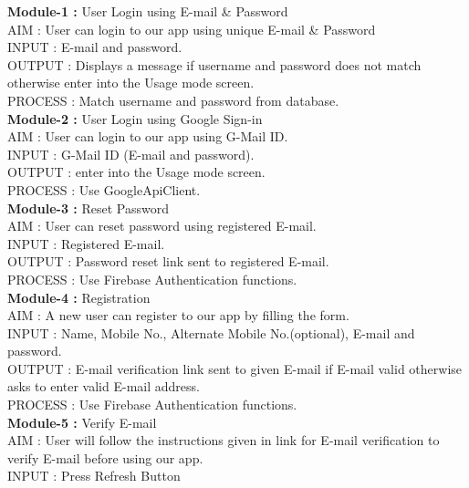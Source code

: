 \documentclass{report}
\begin{document}
\textbf{Module-1 :} User Login using E-mail \& Password \\
AIM : User can login to our app using unique E-mail \& Password\\
                    INPUT : E-mail and password.\\    
                    OUTPUT :  Displays a message if username and password does not match otherwise enter into the Usage mode screen.\\
                    PROCESS : Match username and password from database.\\
\newline
\textbf{Module-2 :} User Login using Google Sign-in\\
                    AIM : User can login to our app using G-Mail ID.\\
                    INPUT : G-Mail ID (E-mail and password).\\
                    OUTPUT : enter into the Usage mode screen.\\
                    PROCESS : Use GoogleApiClient.\\
\newline
\textbf{Module-3 :} Reset Password\\
                    AIM : User can reset password using registered E-mail.\\					INPUT : Registered E-mail.\\
                    OUTPUT : Password reset link sent to registered E-mail.\\
                    PROCESS : Use Firebase Authentication functions.\\
\newline
\textbf{Module-4 :} Registration\\
					AIM : A new user can register to our app by filling the form.\\				INPUT : Name, Mobile No., Alternate Mobile No.(optional), E-mail and password.\\
					OUTPUT : E-mail verification link sent to given E-mail if E-mail valid otherwise asks to enter valid E-mail address.\\
					PROCESS : Use Firebase Authentication functions.\\
\newline
\textbf{Module-5 :} Verify E-mail\\
					AIM : User will follow the instructions given in link for E-mail verification to verify E-mail before using our app.\\
					INPUT : Press Refresh Button\\
\end{document}
